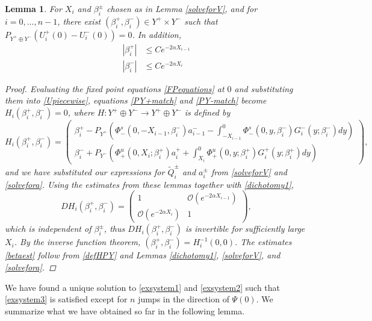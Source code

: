 \documentclass[10pt,reqno]{amsart}
\theoremstyle{plain}
\newtheorem{lemma}[theorem]{Lemma}
\theoremstyle{definition}
\theoremstyle{remark}
\numberwithin{theorem}{section}
\numberwithin{equation}{section}
\begin{document}
\begin{lemma}\label{solveforbeta}
For $X_i$ and $\beta_i^\pm$ chosen as in Lemma \ref{solveforV}, and for $i = 0, \dots, n-1$, there exist $(\beta_i^+, \beta_i^-) \in Y^+ \times Y^-$ such that $P_{Y^+ \oplus Y^-}(U_i^+(0) - U_i^-(0)) = 0$. In addition,
\begin{equation}\label{betaest}
\begin{aligned}
|\beta_i^+| &\leq C e^{-2 \alpha X_{i-1}} \\
|\beta_i^-| &\leq C e^{-2 \alpha X_i}
\end{aligned}
\end{equation}
\begin{proof}
Evaluating the fixed point equations \cref{FPequations} at $0$ and substituting them into \cref{Upiecewise}, equations \cref{PY+match} and \cref{PY-match} become $H_i(\beta_i^+, \beta_i^-) = 0$, where $H: Y^+ \oplus Y^- \rightarrow Y^+ \oplus Y^-$ is defined by
\begin{equation}\label{defHPY}
H_i(\beta_i^+, \beta_i^-) = 
\begin{pmatrix}
\beta_i^+ - P_{Y^+}\left(\Phi^s_-(0, -X_{i-1}, \beta_i^-) a_{i-1}^- 
- \int_{-X_{i-1}}^0 \Phi_-^s(0, y, \beta_i^-) G_i^-(y; \beta_i^-) dy\right) \\
\beta_i^- + P_{Y^-}\left( \Phi^u_+(0, X_i; \beta_i^+) a_i^+ 
+ \int_{X_i}^0 \Phi_+^u(0, y; \beta_i^+) G_i^+(y; \beta_i^+)dy \right)
\end{pmatrix},
\end{equation}
and we have substituted our expressions for $\tilde{Q}_i^\pm$ and $a_i^\pm$ from \cref{solveforV} and \cref{solvefora}. Using the estimates from these lemmas together with \cref{dichotomy1},
\begin{equation}\label{DHexp}
D H_i(\beta_i^+, \beta_i^-) = 
\begin{pmatrix}
1 & \mathcal{O}(e^{-2 \alpha X_{i-1}} ) \\
\mathcal{O}(e^{-2 \alpha X_i}) &  1 
\end{pmatrix},
\end{equation}
which is independent of $\beta_i^\pm$, thus $D H_i(\beta_i^+, \beta_i^-)$ is invertible for sufficiently large $X_i$. By the inverse function theorem, $(\beta_i^+, \beta_i^-) = H_i^{-1}(0, 0)$. The estimates \cref{betaest} follow from \cref{defHPY} and Lemmas \ref{dichotomy1}, \ref{solveforV}, and \ref{solvefora}.
\end{proof}
\end{lemma}

We have found a unique solution to \eqref{exsystem1} and \eqref{exsystem2} such that \eqref{exsystem3} is satisfied except for $n$ jumps in the direction of $\Psi(0)$. We summarize what we have obtained so far in the following lemma.
\end{document}
